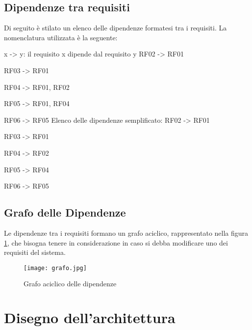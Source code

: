         \subsection{Dipendenze tra requisiti}
        Di seguito è stilato un elenco delle dipendenze formatesi tra i requisiti.
        La nomenclatura utilizzata è la seguente:
        \begin{flushleft}
          x -> y: il requisito x dipende dal requisito y
          \newline
          \newline
          RF02 -> RF01

          RF03 -> RF01

          RF04 -> RF01, RF02

          RF05 -> RF01, RF04

          RF06 -> RF05
          \newline
          \newline
          Elenco delle dipendenze semplificato: 
          \newline
          \newline
          RF02 -> RF01

          RF03 -> RF01

          RF04 -> RF02

          RF05 -> RF04 
          
          RF06 -> RF05
        \end{flushleft}

        \newpage
        \subsection{Grafo delle Dipendenze}
        Le dipendenze tra i requisiti formano un grafo aciclico, rappresentato nella figura \ref{grafoDipendenze}, che bisogna tenere in considerazione in caso si debba modificare uno dei requisiti del sistema.

        \begin{figure}[htp]
          \centering
          \texttt{[image: grafo.jpg]}
          \caption{Grafo aciclico delle dipendenze}\label{grafoDipendenze}
        \end{figure}

\section{Disegno dell'architettura}

